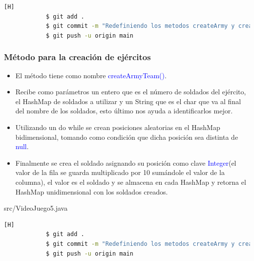 \documentclass{article}
\begin{document}
        
        
        \begin{lstlisting}[language=bash,caption={Commit \href{https://github.com/hernanchoquehuanca/fp2-23b/commit/49a014ba00f3309647cc37d3e4b67ab62dcf8642}{49a014b}: En el commit se modificaba los métodos para trabajar con HashMap dentro del método createArmy eliminando un bucle que anteriormente trabajaba con HashMap}][H]
    		$ git add .
    		$ git commit -m "Redefiniendo los metodos createArmy y createArmyTeam para ahora trabajar con HashMap, ademas se cambiaron las variables de clase que almacenan el tablero y los ejercitos"			
    		$ git push -u origin main
    	\end{lstlisting}
        
        \subsubsection{Método para la creación de ejércitos}

        \begin{itemize}
            \item El método tiene como nombre \textcolor{blue}{createArmyTeam()}.
            \item Recibe como parámetros un entero que es el número de soldados del ejército, el HashMap de soldados a utilizar y un String que es el char que va al final del nombre de los soldados, esto último nos ayuda a identificarlos mejor.
            \item Utilizando un do while se crean posiciones aleatorias en el HashMap bidimensional, tomando como condición que dicha posición sea distinta de \textcolor{blue}{null}.
            \item Finalmente se crea el soldado asignando su posición como clave \textcolor{blue}{Integer}(el valor de la fila se guarda multiplicado por 10 sumándole el valor de la columna), el valor es el soldado y se almacena en cada HashMap y retorna el HashMap unidimensional con los soldados creados.

        \end{itemize}
        \newpage
        
        {src/VideoJuego5.java}

        \begin{lstlisting}[language=bash,caption={Commit \href{https://github.com/hernanchoquehuanca/fp2-23b/commit/49a014ba00f3309647cc37d3e4b67ab62dcf8642}{49a014b}: En el commit se modificaba los métodos para trabajar con HashMap dentro del método createArmyTeam}][H]
    		$ git add .
    		$ git commit -m "Redefiniendo los metodos createArmy y createArmyTeam para ahora trabajar con HashMap, ademas se cambiaron las variables de clase que almacenan el tablero y los ejercitos"			
    		$ git push -u origin main
    	\end{lstlisting}
     
\end{document}
